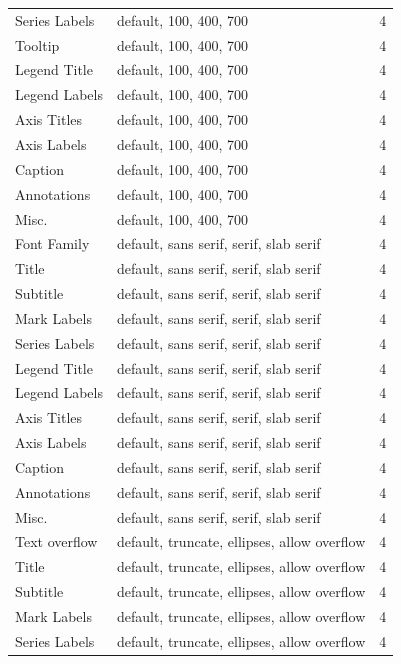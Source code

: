 \documentclass[12pt]{cmuthesis}
\begin{document}
{\begin{longtable}{@{}l p{7.2cm} r@{}}
\qquad Series Labels & default, 100, 400, 700 & 4 \\
\qquad Tooltip & default, 100, 400, 700 & 4 \\
\qquad Legend Title & default, 100, 400, 700 & 4 \\
\qquad Legend Labels & default, 100, 400, 700 & 4 \\
\qquad Axis Titles & default, 100, 400, 700 & 4 \\
\qquad Axis Labels & default, 100, 400, 700 & 4 \\
\qquad Caption & default, 100, 400, 700 & 4 \\
\qquad Annotations & default, 100, 400, 700 & 4 \\
\qquad Misc. & default, 100, 400, 700 & 4 \\
\quad Font Family & default, sans serif, serif, slab serif & 4 \\
\qquad Title & default, sans serif, serif, slab serif & 4 \\
\qquad Subtitle & default, sans serif, serif, slab serif & 4 \\
\qquad Mark Labels & default, sans serif, serif, slab serif & 4 \\
\qquad Series Labels & default, sans serif, serif, slab serif & 4 \\
\qquad Legend Title & default, sans serif, serif, slab serif & 4 \\
\qquad Legend Labels & default, sans serif, serif, slab serif & 4 \\
\qquad Axis Titles & default, sans serif, serif, slab serif & 4 \\
\qquad Axis Labels & default, sans serif, serif, slab serif & 4 \\
\qquad Caption & default, sans serif, serif, slab serif & 4 \\
\qquad Annotations & default, sans serif, serif, slab serif & 4 \\
\qquad Misc. & default, sans serif, serif, slab serif & 4 \\
\quad Text overflow & default, truncate, ellipses, allow overflow & 4 \\
\qquad Title & default, truncate, ellipses, allow overflow & 4 \\
\qquad Subtitle & default, truncate, ellipses, allow overflow & 4 \\
\qquad Mark Labels & default, truncate, ellipses, allow overflow & 4 \\
\qquad Series Labels & default, truncate, ellipses, allow overflow & 4 \\

\end{longtable}}
\end{document}
